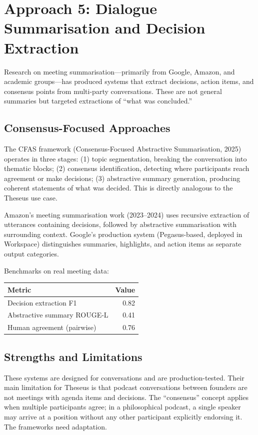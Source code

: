 \documentclass[11pt,letterpaper]{article}
\begin{document}
\section{Approach 5: Dialogue Summarisation and Decision Extraction}

Research on meeting summarisation—primarily from Google, Amazon, and academic groups—has produced systems that extract decisions, action items, and consensus points from multi-party conversations. These are not general summaries but targeted extractions of ``what was concluded.''

\subsection{Consensus-Focused Approaches}

The CFAS framework (Consensus-Focused Abstractive Summarisation, 2025) operates in three stages: (1) topic segmentation, breaking the conversation into thematic blocks; (2) consensus identification, detecting where participants reach agreement or make decisions; (3) abstractive summary generation, producing coherent statements of what was decided. This is directly analogous to the Theseus use case.

Amazon's meeting summarisation work (2023–2024) uses recursive extraction of utterances containing decisions, followed by abstractive summarisation with surrounding context. Google's production system (Pegasus-based, deployed in Workspace) distinguishes summaries, highlights, and action items as separate output categories.

Benchmarks on real meeting data:
\begin{center}
\begin{tabular}{lr}
  \toprule
  \textbf{Metric} & \textbf{Value} \\
  \midrule
  Decision extraction F1 & 0.82 \\
  Abstractive summary ROUGE-L & 0.41 \\
  Human agreement (pairwise) & 0.76 \\
  \bottomrule
\end{tabular}
\end{center}

\subsection{Strengths and Limitations}

These systems are designed for conversations and are production-tested. Their main limitation for Theseus is that podcast conversations between founders are not meetings with agenda items and decisions. The ``consensus'' concept applies when multiple participants agree; in a philosophical podcast, a single speaker may arrive at a position without any other participant explicitly endorsing it. The frameworks need adaptation.
\end{document}
